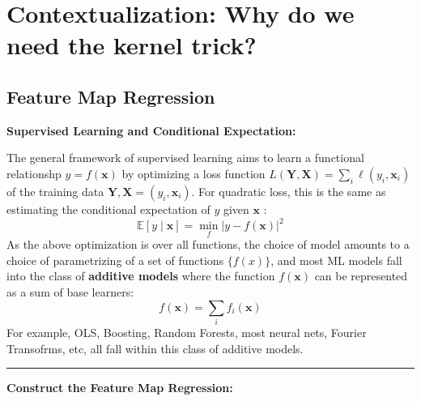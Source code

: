 \documentclass[11pt]{article}
\theoremstyle{plain} %
\theoremstyle{remark}
\begin{document}
\begin{center}

  {}
\end{center}
\vspace{2em}

\tableofcontents



\section{Contextualization: Why do we need the kernel trick?}

\subsection{Feature Map Regression}

\textbf{Supervised Learning and Conditional Expectation:}

The general framework of supervised learning aims to learn a functional
relationshp $y=f(\mathbf{x})$ by optimizing a loss function $L(\mathbf{Y},
  \mathbf{X})=\sum_{i} \ell\left(y_{i}, \mathbf{x}_{i}\right)$ of the training
data $\mathbf{Y},
  \mathbf{X}=\left(y_{i}, \mathbf{x}_{i}\right)$. For quadratic loss, this is the same as
estimating the conditional expectation of $y$ given $\mathbf{x}$ :
$$
  \mathbb{E}[y \mid \mathbf{x}]=\min _{f}|y-f(\mathbf{x})|^{2}
$$
As the above optimization is over all functions, the choice of model amounts to
a choice of parametrizing of a set of functions $\{f(x)\}$, and most ML models fall into the class of
\textbf{additive models} where the function
$f(\mathbf{x})$ can be represented as a sum of base learners:
$$
  f(\mathbf{x})=\sum_{i} f_{i}(\mathbf{x})
$$
For example, OLS, Boosting, Random Forests, most neural nets, Fourier
Transofrms, etc, all fall within this class of additive models.
\vspace*{0.6em}
\hrule

\textbf{Construct the Feature Map Regression:}
\end{document}
